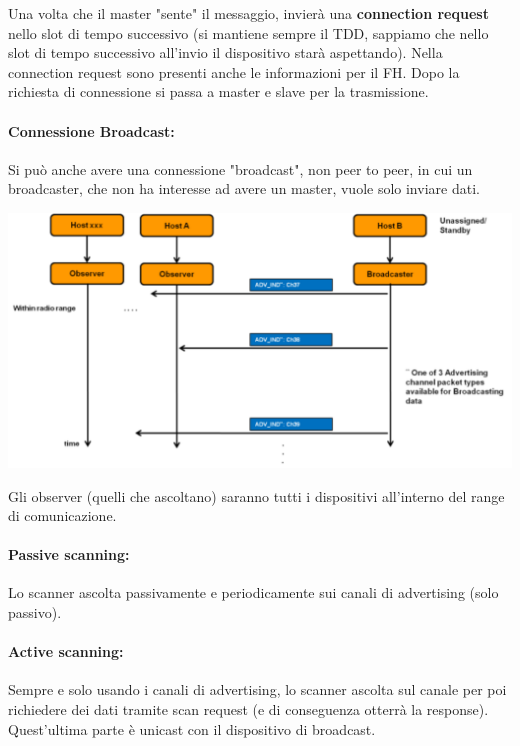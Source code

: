 Una volta che il master "sente" il messaggio, invierà una \textbf{connection request} nello slot di tempo successivo (si mantiene sempre il TDD, sappiamo che nello slot di tempo successivo all'invio il dispositivo starà aspettando). Nella connection request sono presenti anche le informazioni per il FH. Dopo la richiesta di connessione si passa a master e slave per la trasmissione.

\paragraph{Connessione Broadcast:} Si può anche avere una connessione "broadcast", non peer to peer, in cui un broadcaster, che non ha interesse ad avere un master, vuole solo inviare dati.
\begin{center}
	\includegraphics[width=0.98\linewidth]{img/wpan/blebroadcast}
\end{center}
Gli observer (quelli che ascoltano) saranno tutti i dispositivi all'interno del range di comunicazione.

\paragraph{Passive scanning:} Lo scanner ascolta passivamente e periodicamente sui canali di advertising (solo passivo). 

\paragraph{Active scanning:} Sempre e solo usando i canali di advertising, lo scanner ascolta sul canale per poi richiedere dei dati tramite scan request (e di conseguenza otterrà la response). Quest'ultima parte è unicast con il dispositivo di broadcast.



